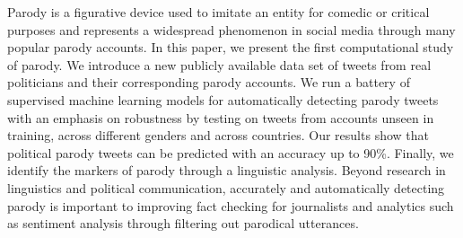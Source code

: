 Parody is a figurative device used to imitate an entity for comedic or critical purposes and represents a widespread phenomenon in social media through many popular parody accounts. In this paper, we present the first computational study of parody. We introduce a new publicly available data set of tweets from real politicians and their corresponding parody accounts. We run a battery of supervised machine learning models for automatically detecting parody tweets with an emphasis on robustness by testing on tweets from accounts unseen in training, across different genders and across countries. Our results show that political parody tweets can be predicted with an accuracy up to 90\%. Finally, we identify the markers of parody through a linguistic analysis. Beyond research in linguistics and political communication, accurately and automatically detecting parody is important to improving fact checking for journalists and analytics such as sentiment analysis through filtering out parodical utterances.
